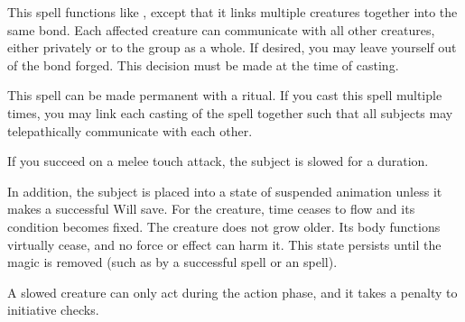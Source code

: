 \begin{spelleffect}
  This spell functions like , except that it links multiple creatures together into the same bond. Each affected creature can communicate with all other creatures, either privately or to the group as a whole. If desired, you may leave yourself out of the bond forged. This decision must be made at the time of casting.
\end{spelleffect}
\begin{spellnotes}
This spell can be made permanent with a  ritual. If you cast this spell multiple times, you may link each casting of the spell together such that all subjects may telepathically communicate with each other. 
\end{spellnotes}

\begin{spelleffect}
  If you succeed on a melee touch attack, the subject is slowed for a \durshort duration.
\end{spelleffect}
\begin{spellblood}
  In addition, the subject is placed into a state of suspended animation unless it makes a successful Will save. For the creature, time ceases to flow and its condition becomes fixed. The creature does not grow older. Its body functions virtually cease, and no force or effect can harm it. This state persists until the magic is removed (such as by a successful  spell or an  spell).
\end{spellblood}
\begin{spellnotes}
 A slowed creature can only act during the action phase, and it takes a  penalty to initiative checks.
\end{spellnotes}

